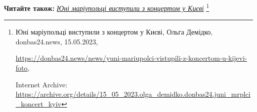  
 
 
 
 

\textbf{Читайте також:} \href{https://archive.org/details/15_05_2023.olga_demidko.donbas24.juni_mrplci_koncert_kyiv}{\emph{Юні маріупольці виступили з концертом у Києві}}%
\footnote{Юні маріупольці виступили з концертом у Києві, Ольга Демідко, donbas24.news, 15.05.2023, \par%
\url{https://donbas24.news/news/yuni-mariupolci-vistupili-z-koncertom-u-kijevi-foto}, \par%
Internet Archive: \url{https://archive.org/details/15_05_2023.olga_demidko.donbas24.juni_mrplci_koncert_kyiv}%
}
